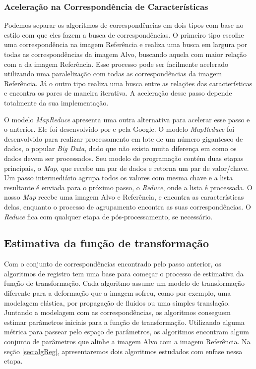 \subsubsection{Aceleração na Correspondência de Características}

    Podemos separar os algoritmos de correspondências em dois tipos com base no estilo com que eles fazem a busca de 
correspondências. O primeiro tipo escolhe uma correspondência na imagem Referência e realiza uma busca em largura por
todas as correspondências da imagem Alvo, buscando aquela com maior relação com a da imagem Referência. Esse processo
pode ser facilmente acelerado utilizando uma paralelização com todas as correspondências da imagem Referência. Já o 
outro tipo realiza uma busca entre as relações das características e encontra os pares de maneira iterativa. A 
aceleração desse passo depende totalmente da sua implementação.

    O modelo \textit{MapReduce} apresenta uma outra alternativa para acelerar esse passo e o anterior. Ele foi 
desenvolvido por \cite{dean2008mapreduce} e pela Google. O modelo \textit{MapReduce} foi desenvolvido para realizar 
processamento em lote de um número gigantesco de dados, o popular \textit{Big Data}, dado que não exista muita diferença 
em como os dados devem ser processados. Seu modelo de programação contém duas etapas principais, o \textit{Map}, que 
recebe um par de dados e retorna um par de valor/chave. Um passo intermediário agrupa todos os valores com mesma chave e
a lista resultante é enviada para o próximo passo, o \textit{Reduce}, onde a lista é processada. O nosso \textit{Map} 
recebe uma imagem Alvo e Referência, e encontra as características delas, enquanto o processo de agrupamento encontra as
suas correspondências. O \textit{Reduce} fica com qualquer etapa de pós-processamento, se necessário.

\subsection{Estimativa da função de transformação}
    
Com o conjunto de correspondências encontrado pelo passo anterior, os algoritmos de registro tem uma base para 
começar o processo de estimativa da função de transformação. Cada algoritmo assume um modelo de transformação diferente
para a deformação que a imagem sofreu, como por exemplo, uma modelagem elástica, por propagação de fluidos ou uma
simples translação. Juntando a modelagem com as correspondências, os algoritmos conseguem estimar parâmetros iniciais
para a função de transformação. Utilizando alguma métrica para passear pelo espaço de parâmetros, os algoritmos encontram
algum conjunto de parâmetros que alinhe a imagem Alvo com a imagem Referência. Na seção \ref{sec:algReg}, apresentaremos
dois algoritmos estudados com enfase nessa etapa.

